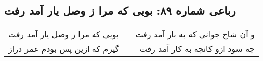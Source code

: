 \begin{center}
\section*{رباعی شماره ۸۹: بویی که مرا ز وصل یار آمد رفت}
\label{sec:sh089}
\begin{longtable}{l p{0.5cm} r}
بویی که مرا ز وصل یار آمد رفت
&&
و آن شاخ جوانی که به بار آمد رفت
\\
گیرم که ازین پس بودم عمر دراز
&&
چه سود ازو کانچه به کار آمد رفت
\\
\end{longtable}
\end{center}
